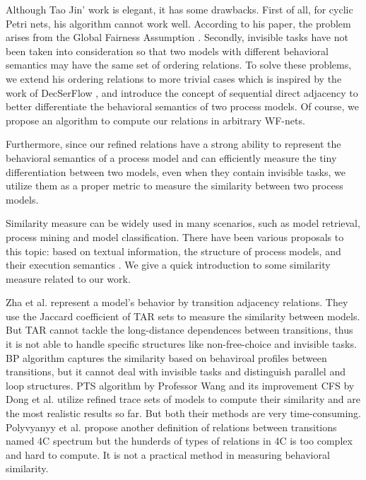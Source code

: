 \documentclass{llncs}
\begin{document}
Although Tao Jin' work is elegant, it has some drawbacks. First of all, for cyclic Petri nets, his algorithm cannot work well. According to his paper, the problem arises from the Global Fairness Assumption \cite{kindler1999liveness}. Secondly, invisible tasks have not been taken into consideration so that two models with different behavioral semantics may have the same set of ordering relations. To solve these problems, we extend his ordering relations to more trivial cases which is inspired by the work of DecSerFlow \cite{van2006decserflow}, and introduce the concept of sequential direct adjacency to better differentiate the behavioral semantics of two process models. Of course, we propose an algorithm to compute our relations in arbitrary WF-nets.

Furthermore, since our refined relations have a strong ability to represent the behavioral semantics of a process model and can efficiently measure the tiny differentiation between two models, even when they contain invisible tasks, we utilize them as a proper metric to measure the similarity between two process models.

Similarity measure can be widely used in many scenarios, such as model retrieval, process mining and model classification. There have been various proposals to this topic: based on textual information, the structure of process models, and their execution semantics \cite{kunze2011behavioral}. We give a quick introduction to some similarity measure related to our work.

Zha et al. \cite{zha2010workflow} represent a model's behavior by transition adjacency relations. They use the Jaccard coefficient of TAR sets to measure the similarity between models. But TAR cannot tackle the long-distance dependences between transitions, thus it is not able to handle specific structures like non-free-choice and invisible tasks. BP algorithm \cite{kunze2011behavioral} captures the similarity based on behaviroal profiles between transitions, but it cannot deal with invisible tasks and distinguish parallel and loop structures. PTS algorithm by Professor Wang \cite{wang2010behavioral} and its improvement CFS by Dong et al. \cite{dong2014cfs} utilize refined trace sets of models to compute their similarity and are the most realistic results so far. But both their methods are very time-consuming. Polyvyanyy et al. \cite{polyvyanyy20144c} propose another definition of relations between transitions named 4C spectrum but the hunderds of types of relations in 4C is too complex and hard to compute. It is not a practical method in measuring behavioral similarity.
\end{document}
